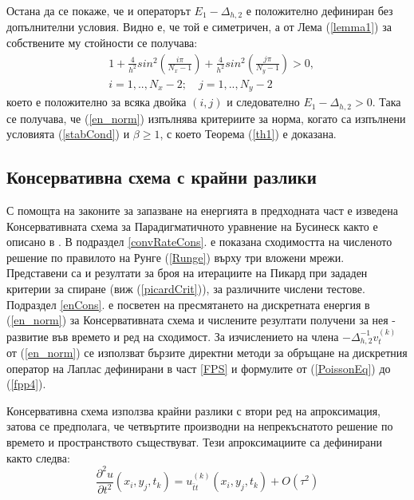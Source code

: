 \documentclass[a4paper]{article}
\newcommand{\be}{\begin{equation}}
\newcommand{\ee}{\end{equation}}
\newcommand{\rf}[1]{(\ref{#1})}
\theoremstyle{remark}
\begin{document}
Остана да се покаже, че и операторът $E_1 - \Delta_{h, 2}$ е положително дефиниран без допълнителни условия. Видно е, че той е симетричен, а от Лема \rf{lemma1} за собствените му стойности се получава:
\begin{align}
&1+ \frac{4}{h^2}sin^2(\frac{i \pi}{N_x-1}) + \frac{4}{h^2}sin^2(\frac{j \pi}{N_y-1}) >0, \nonumber\\
&i = 1,..,N_x-2; \quad j = 1, .. , N_y-2 \nonumber
\end{align}
което е положително за всяка двойка $(i, j)$ и следователно $E_1 - \Delta_{h, 2} > 0$. Така се получава, че \rf{en_norm} изпълнява критериите за норма, когато са изпълнени условията \rf{stabCond} и $\beta \ge 1$, с което Теорема \rf{th1} е доказана.

\subsection{ Консервативна схема с крайни разлики}
С помощта на законите за запазване на енергията в предходната част е изведена Консервативната схема за Парадигматичното уравнение на Бусинеск както е описано в \cite{ref25}. В подраздел \ref{convRateCons}. е показана сходимостта на численото решение по правилото на Рунге \rf{Runge} върху три вложени мрежи. Представени са и резултати за броя на итерациите на Пикард при зададен критерии за спиране (виж \rf{picardCrit}), за различните числени тестове. Подраздел \ref{enCons}. е посветен на пресмятането на дискретната енергия в \rf{en_norm} за Консервативната схема и числените резултати получени за нея - развитие във времето и ред на сходимост. За изчислението на члена $-\Delta_{h,2}^{-1}v_{t}^{(k)}$ от \rf{en_norm} се използват бързите директни методи за обръщане на дискретния оператор на Лаплас дефинирани в част \ref{FPS} и формулите от \rf{PoissonEq} до \rf{fpp4}.

Консервативна схема използва крайни разлики с втори ред на апроксимация, затова се предполага, че четвъртите производни на непрекъснатото решение по времето и пространството съществуват. Тези апроксимациите са дефинирани както следва:
\be\label{difft}
\frac{\partial^2 u}{\partial t^2}(x_i, y_j, t_k ) = u^{(k)}_{\bar{t}t}(x_i, y_j, t_k ) + O(\tau^2) 
\ee
\end{document}

